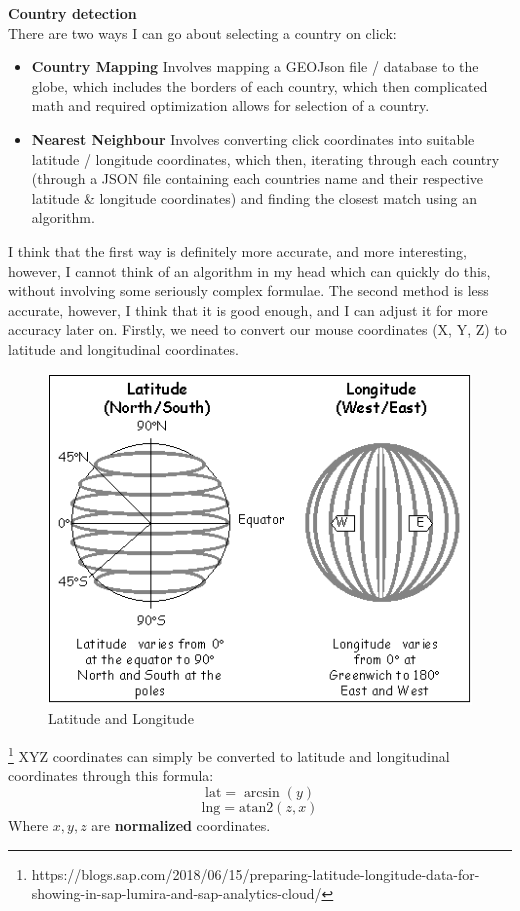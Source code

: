 \textbf{Country detection} \\
There are two ways I can go about selecting a country on click:
\begin{itemize}
    \item \textbf{Country Mapping}
    Involves mapping a GEOJson file / database to the globe, which includes the borders of each country, which then complicated math and required optimization allows for selection of a country.
    \item \textbf{Nearest Neighbour}
    Involves converting click coordinates into suitable latitude / longitude coordinates, which then, iterating through each country (through a JSON file containing each countries name and their respective latitude \& longitude coordinates) and finding the closest match using an algorithm.
\end{itemize}
\newpage
I think that the first way is definitely more accurate, and more interesting, however, I cannot think of an algorithm in my head which can quickly do this, without involving some seriously complex formulae. The second method is less accurate, however, I think that it is good enough, and I can adjust it for more accuracy later on.
Firstly, we need to convert our mouse coordinates (X, Y, Z) to latitude and longitudinal coordinates.
\begin{figure}[ht]
\centering
\includegraphics[width=0.7\linewidth]{images/lat_long}
\caption{Latitude and Longitude}
\label{fig:lat_long}
\end{figure}\footnote{https://blogs.sap.com/2018/06/15/preparing-latitude-longitude-data-for-showing-in-sap-lumira-and-sap-analytics-cloud/}
XYZ coordinates can simply be converted to latitude and longitudinal coordinates through this formula:
$$\textrm{lat} = \arcsin(y)$$
$$\textrm{lng} = \textrm{atan2}(z, x)$$
Where $x, y, z$ are \textbf{normalized} coordinates.
